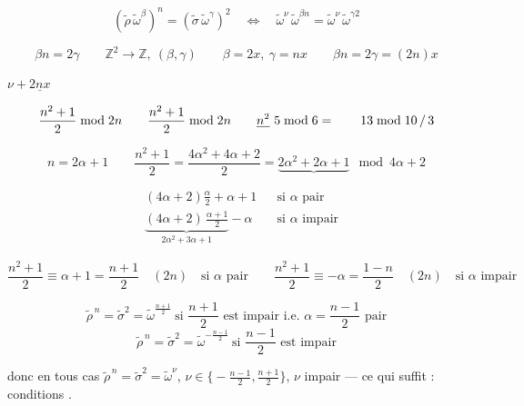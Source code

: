\documentclass[11pt,a4paper]{article}
\begin{document}

\[
(\tilde\rho\,\tilde\omega^{\beta})^n = (\tilde\sigma\,\tilde\omega^{\gamma})^2
\quad \Leftrightarrow \quad
\tilde\omega^{\nu}\,\tilde\omega^{\beta n} = \tilde\omega^{\nu}\,\tilde\omega^{\gamma 2}
\]

\[
\beta n = 2\gamma \qquad
\mathbb{Z}^2 \longrightarrow \mathbb{Z}, \ (\beta, \gamma)
\qquad
\beta = 2x,\ \gamma = nx \qquad \beta n = 2\gamma = (2n)x
\]

$\nu + \underline{2nx}$


\[
\frac{n^2+1}{2} \bmod 2n \qquad \frac{n^2+1}{2} \bmod 2n
\qquad \struck{n^2}\ 5 \bmod 6 =
\qquad 13 \bmod 10 \,/\, 3
\]

\[
n = 2\alpha + 1 \qquad
\frac{n^2+1}{2} = \frac{4\alpha^2 + 4\alpha + 2}{2} = \underbrace{2\alpha^2 + 2\alpha + 1}
\ \bmod 4\alpha + 2
\]

\begin{align*}
&(4\alpha+2)\frac{\alpha}{2} + \alpha + 1 && \text{si } \alpha \text{ pair} \\
&\underbrace{(4\alpha+2)\,\frac{\alpha+1}{2}}_{2\alpha^2 + 3\alpha + 1} - \alpha && \text{si } \alpha \text{ impair}
\end{align*}

\[
\frac{n^2+1}{2} \equiv \alpha + 1 = \frac{n+1}{2} \quad (2n) \quad \text{si } \alpha \text{ pair}
\qquad
\frac{n^2+1}{2} \equiv -\alpha = \frac{1-n}{2} \quad (2n) \quad \text{si } \alpha \text{ impair}
\]


\[
\tilde\rho^{\,n} = \tilde\sigma^{2} = \tilde\omega^{\frac{n+1}{2}}
\ \text{si } \frac{n+1}{2} \text{ est impair i.e. } \alpha = \frac{n-1}{2} \text{ pair}
\]
\[
\tilde\rho^{\,n} = \tilde\sigma^{2} = \tilde\omega^{-\frac{n-1}{2}}
\ \text{si } \frac{n-1}{2} \text{ est impair}
\]

donc en tous cas $\tilde\rho^{\,n} = \tilde\sigma^{2} = \tilde\omega^{\nu}$,
$\nu \in \bigl\{-\tfrac{n-1}{2}, \tfrac{n+1}{2}\bigr\}$, $\nu$ impair
--- ce qui suffit : conditions \ill{}.

\end{document}
